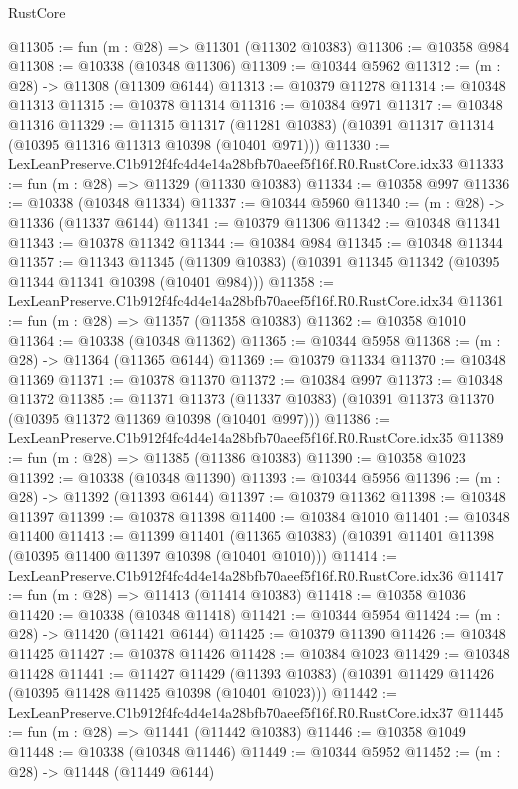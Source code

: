\begin{lexlean}{RustCore}
\begin{coremodule}
@11305 := fun (m : @28) => @11301 (@11302 @10383)
@11306 := @10358 @984
@11308 := @10338 (@10348 @11306)
@11309 := @10344 @5962
@11312 := (m : @28) -> @11308 (@11309 @6144)
@11313 := @10379 @11278
@11314 := @10348 @11313
@11315 := @10378 @11314
@11316 := @10384 @971
@11317 := @10348 @11316
@11329 := @11315
    @11317
    (@11281 @10383)
    (@10391 @11317 @11314 (@10395 @11316 @11313 @10398 (@10401 @971)))
@11330 := LexLeanPreserve.C1b912f4fc4d4e14a28bfb70aeef5f16f.R0.RustCore.idx33
@11333 := fun (m : @28) => @11329 (@11330 @10383)
@11334 := @10358 @997
@11336 := @10338 (@10348 @11334)
@11337 := @10344 @5960
@11340 := (m : @28) -> @11336 (@11337 @6144)
@11341 := @10379 @11306
@11342 := @10348 @11341
@11343 := @10378 @11342
@11344 := @10384 @984
@11345 := @10348 @11344
@11357 := @11343
    @11345
    (@11309 @10383)
    (@10391 @11345 @11342 (@10395 @11344 @11341 @10398 (@10401 @984)))
@11358 := LexLeanPreserve.C1b912f4fc4d4e14a28bfb70aeef5f16f.R0.RustCore.idx34
@11361 := fun (m : @28) => @11357 (@11358 @10383)
@11362 := @10358 @1010
@11364 := @10338 (@10348 @11362)
@11365 := @10344 @5958
@11368 := (m : @28) -> @11364 (@11365 @6144)
@11369 := @10379 @11334
@11370 := @10348 @11369
@11371 := @10378 @11370
@11372 := @10384 @997
@11373 := @10348 @11372
@11385 := @11371
    @11373
    (@11337 @10383)
    (@10391 @11373 @11370 (@10395 @11372 @11369 @10398 (@10401 @997)))
@11386 := LexLeanPreserve.C1b912f4fc4d4e14a28bfb70aeef5f16f.R0.RustCore.idx35
@11389 := fun (m : @28) => @11385 (@11386 @10383)
@11390 := @10358 @1023
@11392 := @10338 (@10348 @11390)
@11393 := @10344 @5956
@11396 := (m : @28) -> @11392 (@11393 @6144)
@11397 := @10379 @11362
@11398 := @10348 @11397
@11399 := @10378 @11398
@11400 := @10384 @1010
@11401 := @10348 @11400
@11413 := @11399
    @11401
    (@11365 @10383)
    (@10391 @11401 @11398 (@10395 @11400 @11397 @10398 (@10401 @1010)))
@11414 := LexLeanPreserve.C1b912f4fc4d4e14a28bfb70aeef5f16f.R0.RustCore.idx36
@11417 := fun (m : @28) => @11413 (@11414 @10383)
@11418 := @10358 @1036
@11420 := @10338 (@10348 @11418)
@11421 := @10344 @5954
@11424 := (m : @28) -> @11420 (@11421 @6144)
@11425 := @10379 @11390
@11426 := @10348 @11425
@11427 := @10378 @11426
@11428 := @10384 @1023
@11429 := @10348 @11428
@11441 := @11427
    @11429
    (@11393 @10383)
    (@10391 @11429 @11426 (@10395 @11428 @11425 @10398 (@10401 @1023)))
@11442 := LexLeanPreserve.C1b912f4fc4d4e14a28bfb70aeef5f16f.R0.RustCore.idx37
@11445 := fun (m : @28) => @11441 (@11442 @10383)
@11446 := @10358 @1049
@11448 := @10338 (@10348 @11446)
@11449 := @10344 @5952
@11452 := (m : @28) -> @11448 (@11449 @6144)

\end{coremodule}
\end{lexlean}
